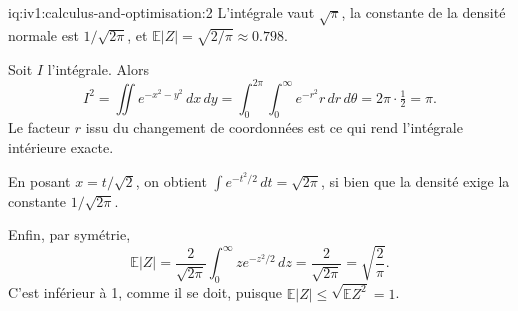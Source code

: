 \begin{solution}{iq:iv1:calculus-and-optimisation:2}
L'intégrale vaut $\sqrt{\pi}$, la constante de la densité normale est $1/\sqrt{2\pi}$, et $\mathbb{E}|Z| = \sqrt{2/\pi} \approx 0.798$.

Soit $I$ l'intégrale. Alors
\[
I^2 = \iint e^{-x^2 - y^2}\,dx\,dy = \int_0^{2\pi}\!\!\int_0^\infty e^{-r^2} r\,dr\,d\theta = 2\pi \cdot \tfrac12 = \pi.
\]
Le facteur $r$ issu du changement de coordonnées est ce qui rend l'intégrale intérieure exacte.

En posant $x = t/\sqrt{2}$, on obtient $\int e^{-t^2/2}\,dt = \sqrt{2\pi}$, si bien que la densité exige la constante $1/\sqrt{2\pi}$.

Enfin, par symétrie,
\[
\mathbb{E}|Z| = \frac{2}{\sqrt{2\pi}}\int_0^\infty z e^{-z^2/2}\,dz = \frac{2}{\sqrt{2\pi}} = \sqrt{\frac{2}{\pi}}.
\]
C'est inférieur à 1, comme il se doit, puisque $\mathbb{E}|Z| \le \sqrt{\mathbb{E}Z^2} = 1$.



\end{solution}

